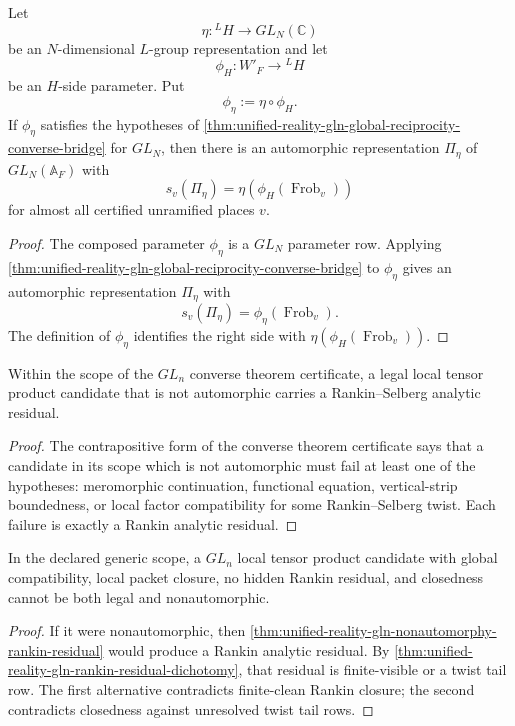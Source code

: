 \begin{theorem}
\label{thm:unified-reality-gln-functorial-transfer-converse-bridge}
Let
$$
\eta:{}^LH\to GL_N(\mathbb C)
$$
be an $N$-dimensional $L$-group representation and let
$$
\phi_H:W'_F\to{}^LH
$$
be an $H$-side parameter. Put
$$
\phi_{\eta}:=\eta\circ\phi_H.
$$
If $\phi_{\eta}$ satisfies the hypotheses of
\autoref{thm:unified-reality-gln-global-reciprocity-converse-bridge}
for $GL_N$, then there is an automorphic representation $\Pi_{\eta}$ of
$GL_N(\mathbb A_F)$ with
$$
s_v(\Pi_{\eta})
=
\eta(\phi_H(\operatorname{Frob}_v))
$$
for almost all certified unramified places $v$.
\end{theorem}
\begin{proof}
The composed parameter $\phi_{\eta}$ is a $GL_N$ parameter row. Applying
\autoref{thm:unified-reality-gln-global-reciprocity-converse-bridge} to
$\phi_{\eta}$ gives an automorphic representation $\Pi_{\eta}$ with
$$
s_v(\Pi_{\eta})=\phi_{\eta}(\operatorname{Frob}_v).
$$
The definition of $\phi_{\eta}$ identifies the right side with
$\eta(\phi_H(\operatorname{Frob}_v))$.
\end{proof}

\begin{theorem}
\label{thm:unified-reality-gln-nonautomorphy-rankin-residual}
Within the scope of the $GL_n$ converse theorem certificate, a legal
local tensor product candidate that is not automorphic carries a
Rankin--Selberg analytic residual.
\end{theorem}
\begin{proof}
The contrapositive form of the converse theorem certificate says that a
candidate in its scope which is not automorphic must fail at least one
of the hypotheses: meromorphic continuation, functional equation,
vertical-strip boundedness, or local factor compatibility for some
Rankin--Selberg twist. Each failure is exactly a Rankin analytic
residual.
\end{proof}

\begin{corollary}
\label{cor:unified-reality-closed-gln-candidates-automorphic}
In the declared generic scope, a $GL_n$ local tensor product candidate
with global compatibility, local packet closure, no hidden Rankin
residual, and closedness cannot be both legal and nonautomorphic.
\end{corollary}
\begin{proof}
If it were nonautomorphic, then
\autoref{thm:unified-reality-gln-nonautomorphy-rankin-residual} would
produce a Rankin analytic residual. By
\autoref{thm:unified-reality-gln-rankin-residual-dichotomy}, that
residual is finite-visible or a twist tail row. The first alternative
contradicts finite-clean Rankin closure; the second contradicts
closedness against unresolved twist tail rows.
\end{proof}

